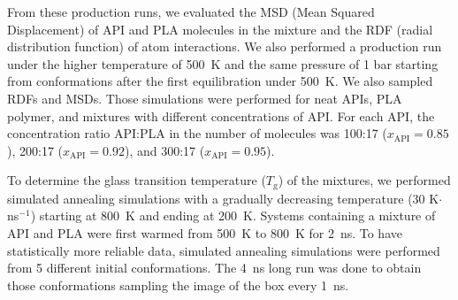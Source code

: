 From these production runs, we evaluated the MSD (Mean Squared Displacement) of API and PLA molecules in the mixture and the RDF (radial distribution function) of atom interactions. We also performed a production run under the higher temperature of 500~K and the same pressure of 1 bar starting from conformations after the first equilibration under 500~K. We also sampled RDFs and MSDs. Those simulations were performed for neat APIs, PLA polymer, and mixtures with different concentrations of API. For each API, the concentration ratio API:PLA in the number of molecules was 100:17 ($x_\mathrm{API}=0.85$), 200:17 ($x_\mathrm{API}=0.92$), and 300:17 ($x_\mathrm{API}=0.95$). 

To determine the glass transition temperature ($T_\mathrm{g}$) of the mixtures, we performed simulated annealing simulations with a gradually decreasing temperature (30 K$\cdot$ ns$^{-1}$) starting at 800~K and ending at 200~K. Systems containing a mixture of API and PLA were first warmed from 500~K to 800~K for 2~ns. To have statistically more reliable data, simulated annealing simulations were performed from 5 different initial conformations. The 4~ns long run was done to obtain those conformations sampling the image of the box every 1~ns.  